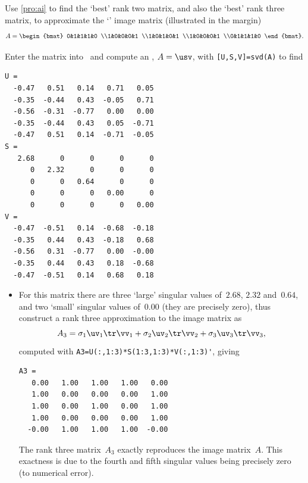 \begin{example} \label{eg:bullseyemat}
Use \cref{pro:ai} to find the `best' rank two matrix, and also the `best' rank three matrix, to approximate the `' image matrix (illustrated in the margin)
\marginpar{}
\begin{equation*}
A=\begin{bmat} 0&1&1&1&0
\\1&0&0&0&1
\\1&0&1&0&1
\\1&0&0&0&1
\\0&1&1&1&0 \end{bmat}.
\end{equation*}
\begin{solution} 
Enter the matrix into \script\ and compute an \svd, \(A=\usv\), with \verb|[U,S,V]=svd(A)| to find \twodp
\begin{verbatim}
U =
  -0.47   0.51   0.14   0.71   0.05
  -0.35  -0.44   0.43  -0.05   0.71
  -0.56  -0.31  -0.77   0.00   0.00
  -0.35  -0.44   0.43   0.05  -0.71
  -0.47   0.51   0.14  -0.71  -0.05
S =
   2.68      0      0      0      0
      0   2.32      0      0      0
      0      0   0.64      0      0
      0      0      0   0.00      0
      0      0      0      0   0.00
V =
  -0.47  -0.51   0.14  -0.68  -0.18
  -0.35   0.44   0.43  -0.18   0.68
  -0.56   0.31  -0.77   0.00  -0.00
  -0.35   0.44   0.43   0.18  -0.68
  -0.47  -0.51   0.14   0.68   0.18
\end{verbatim}
\setbox\ajrqrbox\hbox{}%
\marginajrbox%
\begin{itemize}
\item For this matrix there are three `large' singular values of~\(2.68\), \(2.32\) and~\(0.64\), and two `small' singular values of~\(0.00\) (they are precisely zero), thus construct a rank three approximation to the image matrix as
\begin{equation*}
A_3=\sigma_1\uv_1\tr\vv_1+\sigma_2\uv_2\tr\vv_2+\sigma_3\uv_3\tr\vv_3,
\end{equation*}
computed with \verb|A3=U(:,1:3)*S(1:3,1:3)*V(:,1:3)'|, giving \twodp
\begin{verbatim}
A3 =
   0.00   1.00   1.00   1.00   0.00
   1.00   0.00   0.00   0.00   1.00
   1.00   0.00   1.00   0.00   1.00
   1.00   0.00   0.00   0.00   1.00
  -0.00   1.00   1.00   1.00  -0.00
\end{verbatim}
The rank three matrix~\(A_3\) exactly reproduces the image matrix~\(A\). 
This exactness is due to the  fourth and fifth singular values being precisely zero (to numerical error).


\end{itemize}
\end{solution}
\end{example}
